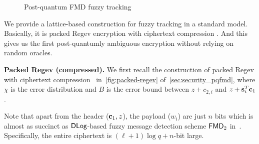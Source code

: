 \begin{figure}[!t]
\begin{pchstack}[boxed]
        \pchspace
        \begin{pcvstack}
        \pcvspace
        \pcvspace
        \pcvspace
        \end{pcvstack}
    \end{pchstack}
    \caption{Post-quantum FMD fuzzy tracking}
    \label{fig:fuzzy-tracking}
\end{figure}

We provide a lattice-based construction for fuzzy tracking in a standard model. Basically, it is packed Regev encryption with ciphertext compression \cite{TCC:BDGM19}. And this gives us the first post-quantumly ambiguous encryption without relying on random oracles.


\smallskip\noindent\textbf{Packed Regev (compressed).}
We first recall the construction of packed Regev with ciphertext compression~\cite{TCC:BDGM19} in~\cref{fig:packed-regev} of~\cref{sec:security_pqfmd}, where $\chi$ is the error distribution and $B$ is the error bound between $z+c_{2,i}$ and $z+\mathbf{s}_i^T\mathbf{c}_1$.

Note that apart from the header ($\mathbf{c}_1,z$), the payload ($w_i$) are just $n$ bits which is almost as succinct as $\mathsf{DLog}$-based fuzzy message detection scheme $\mathsf{FMD}_2$ in~\cite{CCS:BLMG21}. Specifically, the entire ciphertext is $(\ell+1)\log q+n$-bit large. 

